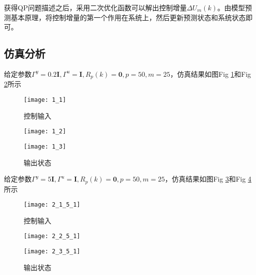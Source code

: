 \documentclass[UTF8]{article}
\begin{document}
获得QP问题描述之后，采用二次优化函数可以解出控制增量$\Delta U_{m}(k)$。由模型预测基本原理，将控制增量的第一个作用在系统上，然后更新预测状态和系统状态即可。

\subsection{仿真分析}
给定参数$\Gamma^{y}=0.2\mathbf{I},\Gamma^{u}=\mathbf{I},R_{p}(k)=\mathbf{0},p=50,m=25$，仿真结果如图Fig \ref{fig:1_1}和Fig \ref{fig:1_2}所示
\begin{figure}[htbp]
    \centering
    \texttt{[image: 1\_1]}
    \caption{控制输入}
    \label{fig:1_1}
\end{figure}
\begin{figure}[htbp]
    \setlength{\belowcaptionskip}{-0.45cm}
    
        \begin{minipage}{0.49\textwidth}
        \centering
    
        \texttt{[image: 1\_2]}    
        \end{minipage}
        \begin{minipage}{0.49\textwidth}
        \centering
        \texttt{[image: 1\_3]}    
        \end{minipage}
    \caption{输出状态}
    \label{fig:1_2}
\end{figure}

给定参数$\Gamma^{y}=5\mathbf{I},\Gamma^{u}=\mathbf{I},R_{p}(k)=\mathbf{0},p=50,m=25$，仿真结果如图Fig \ref{fig:1_3}和Fig \ref{fig:1_4}所示
\begin{figure}[htbp]
    \centering
    \texttt{[image: 2\_1\_5\_1]}
    \caption{控制输入}
    \label{fig:1_3}
\end{figure}
\begin{figure}[htbp]
    \setlength{\belowcaptionskip}{-0.45cm}
    
        \begin{minipage}{0.49\textwidth}
        \centering
    
        \texttt{[image: 2\_2\_5\_1]}    
        \end{minipage}
        \begin{minipage}{0.49\textwidth}
        \centering
        \texttt{[image: 2\_3\_5\_1]}    
        \end{minipage}
    \caption{输出状态}
    \label{fig:1_4}
\end{figure}
\end{document}
